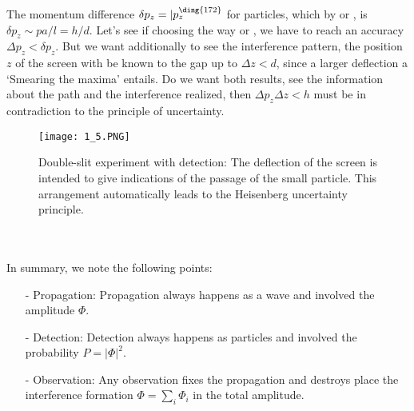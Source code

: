 \\
The momentum difference $\delta p_z = | p_z^{\ding{172}}$ for particles, which by  or , is $\delta p_z \sim pa/l=h/d$. Let's see if choosing the way  or , we have to reach an accuracy $\Delta p_z < \delta p_z$. But we want additionally to see the interference pattern, the position $z$ of the screen with be known to the gap up to $\Delta z <d$, since a larger deflection a `Smearing the maxima' entails. Do we want both results, see the information about the path and the interference realized, then $\Delta p_z \Delta z <h$ must be in contradiction to the principle of uncertainty.
\begin{figure}[ht]
    \centering
    \texttt{[image: 1\_5.PNG]}
    \caption{Double-slit experiment with detection: The deflection of the screen is intended to give indications of the passage of the small particle. This arrangement automatically leads to the Heisenberg uncertainty principle.}
    \label{fig:1.5}
\end{figure}
\\ \\
In summary, we note the following points:
\begin{itemize}
    \item[-] Propagation: Propagation always happens as a wave and involved the amplitude $\Phi$.
    \item[-] Detection: Detection always happens as particles and involved the probability $P = | \Phi |^2$.
    \item[-] Observation: Any observation fixes the propagation and destroys place the interference formation $\Phi = \sum_i \Phi_i$ in the total amplitude.
\end{itemize}

